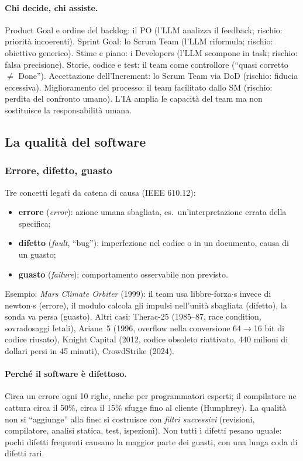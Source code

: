 \documentclass[a4paper,12pt]{article}
\begin{document}
\paragraph{Chi decide, chi assiste.} Product Goal e ordine del backlog: il PO (l'LLM analizza
il feedback; rischio: priorità incoerenti). Sprint Goal: lo Scrum Team (l'LLM riformula;
rischio: obiettivo generico). Stime e piano: i Developers (l'LLM scompone in task; rischio:
falsa precisione). Storie, codice e test: il team come controllore (``quasi corretto $\neq$
Done''). Accettazione dell'Increment: lo Scrum Team via DoD (rischio: fiducia eccessiva).
Miglioramento del processo: il team facilitato dallo SM (rischio: perdita del confronto
umano). L'IA amplia le capacità del team ma non sostituisce la responsabilità umana.

\subsection{La qualità del software}

\subsubsection{Errore, difetto, guasto}
Tre concetti legati da catena di causa (IEEE 610.12):
\begin{itemize}
  \item \textbf{errore} (\emph{error}): azione umana sbagliata, es.\ un'interpretazione errata
        della specifica;
  \item \textbf{difetto} (\emph{fault}, ``bug''): imperfezione nel codice o in un documento,
        causa di un guasto;
  \item \textbf{guasto} (\emph{failure}): comportamento osservabile non previsto.
\end{itemize}
Esempio: \emph{Mars Climate Orbiter} (1999): il team usa libbre-forza$\cdot$s invece di
newton$\cdot$s (errore), il modulo calcola gli impulsi nell'unità sbagliata (difetto), la
sonda va persa (guasto). Altri casi: Therac-25 (1985--87, race condition, sovradosaggi letali),
Ariane~5 (1996, overflow nella conversione 64$\to$16 bit di codice riusato), Knight Capital
(2012, codice obsoleto riattivato, 440 milioni di dollari persi in 45 minuti), CrowdStrike (2024).

\paragraph{Perché il software è difettoso.} Circa un errore ogni 10 righe, anche per
programmatori esperti; il compilatore ne cattura circa il 50\%, circa il 15\% sfugge fino al
cliente (Humphrey). La qualità non si ``aggiunge'' alla fine: si costruisce con \emph{filtri
successivi} (revisioni, compilatore, analisi statica, test, ispezioni). Non tutti i difetti
pesano uguale: pochi difetti frequenti causano la maggior parte dei guasti, con una lunga coda
di difetti rari.
\end{document}
